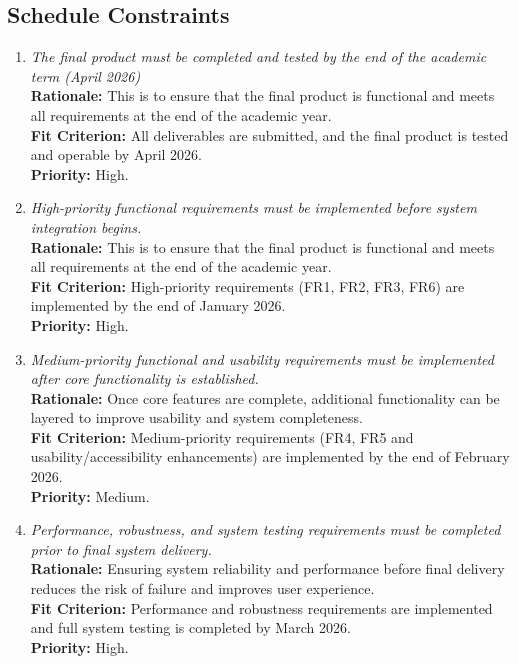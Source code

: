 \documentclass[12pt]{article}
\begin{document}
\subsection{Schedule Constraints}
\begin{enumerate}[label=MD-SC \arabic*., wide=0pt, leftmargin=*]
  \item \emph{The final product must be completed and tested by the
    end of the academic term (April 2026)}\\[2mm]
    {\bf Rationale:} This is to ensure that the final product is
    functional and meets all requirements
    at the end of the academic year.\\
    {\bf Fit Criterion:} All deliverables are submitted, and the
    final product is tested and operable by April 2026. \\
    {\bf Priority:} High.

    \item \emph{High-priority functional requirements must be implemented before system integration begins.}\\[2mm]
    {\bf Rationale:} This is to ensure that the final product is
    functional and meets all requirements
    at the end of the academic year.\\
    {\bf Fit Criterion:} High-priority requirements (FR1, FR2, FR3, FR6) are implemented by the end of January 2026. \\
    {\bf Priority:} High.

    \item \emph{Medium-priority functional and usability requirements must be implemented after core 
    functionality is established.}\\[2mm]
    {\bf Rationale:} Once core features are complete, additional functionality can be layered to 
    improve usability and system completeness.\\
    {\bf Fit Criterion:} Medium-priority requirements (FR4, FR5 and usability/accessibility enhancements) 
    are implemented by the end of February 2026. \\
    {\bf Priority:} Medium.

    \item \emph{Performance, robustness, and system testing requirements must be completed prior to final system delivery.}\\[2mm]
    {\bf Rationale:} Ensuring system reliability and performance before final delivery reduces the risk of 
    failure and improves user experience.\\
    {\bf Fit Criterion:} Performance and robustness requirements are implemented and full system testing is completed by March 2026. \\
    {\bf Priority:} High.


\end{enumerate}
\end{document}

